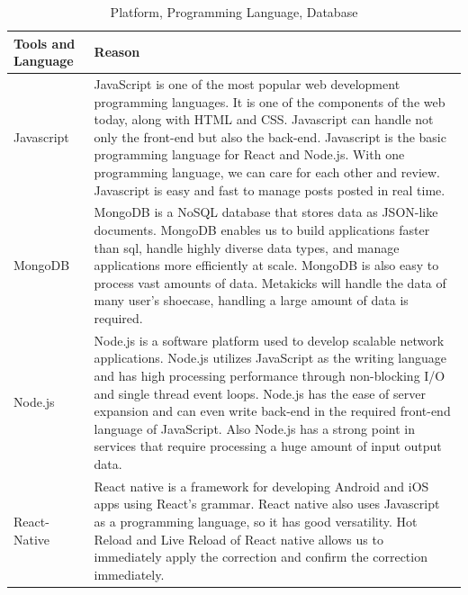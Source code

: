 \documentclass[conference]{IEEEtran}
\begin{document}
\begin{table}[h]
\caption{Platform, Programming Language, Database}
\def\arraystretch{1.25} \small
    \begin{tabular}{|p{2.4cm}|p{5.0cm}|}
	\hline
	Tools and Language & Reason\\
      \hline
       Javascript & JavaScript is one of the most popular web development programming languages. It is one of the components of the web today, along with HTML and CSS. Javascript can handle not only the front-end but also the back-end. Javascript is the basic programming language for React and Node.js. With one programming language, we can care for each other and review. Javascript is easy and fast to manage posts posted in real time. \\
	\hline
        MongoDB & MongoDB is a NoSQL database that stores data as JSON-like documents. MongoDB enables us to build applications faster than sql, handle highly diverse data types, and manage applications more efficiently at scale. MongoDB is also easy to process vast amounts of data. Metakicks will handle the data of many user's shoecase, handling a large amount of data is required.\\
	\hline
        Node.js & Node.js is a software platform used to develop scalable network applications. Node.js utilizes JavaScript as the writing language and has high processing performance through non-blocking I/O and single thread event loops. Node.js has the ease of server expansion and can even write back-end in the required front-end language of JavaScript. Also Node.js has a strong point in services that require processing a huge amount of input output data.\\
	\hline
	React-Native & React native is a framework for developing Android and iOS apps using React's grammar. React native also uses Javascript as a programming language, so it has good versatility. Hot Reload and Live Reload of React native allows us to immediately apply the correction and confirm the correction immediately.\\
	\hline
	\end{tabular}
\end{table}
\end{document}
